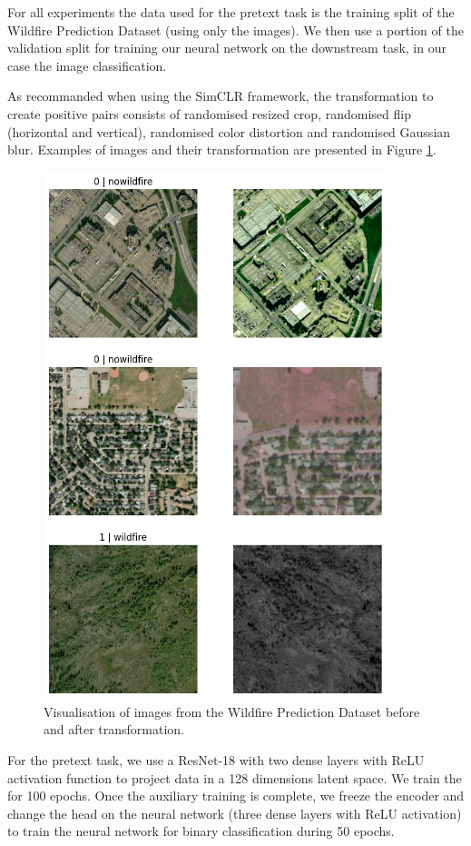 \documentclass{article}
\begin{document}
For all experiments the data used for the pretext task is the training split of the Wildfire Prediction Dataset (using only the images). We then use a portion of the validation split for training our neural network on the downstream task, in our case the image classification.

As recommanded when using the SimCLR framework, the transformation to create positive pairs consists of randomised resized crop, randomised flip (horizontal and vertical), randomised color distortion and randomised Gaussian blur. Examples of images and their transformation are presented in Figure \ref{transform}.

\begin{figure}[]
    \centering
    \includegraphics[width=10cm]{img/transform.png}
    \caption{Visualisation of images from the Wildfire Prediction Dataset before and after transformation.}
    \label{transform}
\end{figure}

For the pretext task, we use a ResNet-18 with two dense layers with ReLU activation function to project data in a 128 dimensions latent space. We train the for 100 epochs. Once the auxiliary training is complete, we freeze the encoder and change the head on the neural network (three dense layers with ReLU activation) to train the neural network for binary classification during 50 epochs.
\end{document}
